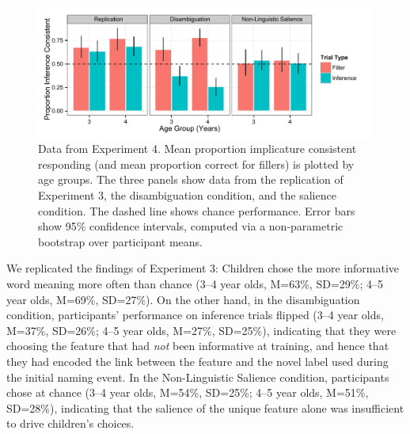 \documentclass[review]{elsarticle}
\begin{document}
\begin{figure}
\begin{center}
\includegraphics[width=5in]{e4_barplot.pdf}
\caption{\label{fig:kids} Data from Experiment 4. Mean proportion implicature consistent responding (and mean proportion correct for fillers) is plotted by age groups. The three panels show data from the replication of Experiment 3, the disambiguation condition, and the salience condition. The dashed line shows chance performance. Error bars show 95\% confidence intervals, computed via a non-parametric bootstrap over participant means.}
\end{center}
\end{figure}


We replicated the findings of Experiment 3: Children chose the more informative word meaning more often than chance (3--4 year olds, M=63\%, SD=29\%; 4--5 year olds, M=69\%, SD=27\%). On the other hand, in the disambiguation condition, participants' performance on inference trials flipped  (3--4 year olds, M=37\%, SD=26\%; 4--5 year olds, M=27\%, SD=25\%), indicating that they were choosing the feature that had \emph{not} been informative at training, and hence that they had encoded the link between the feature and the novel label used during the initial naming event. In the Non-Linguistic Salience condition, participants chose at chance  (3--4 year olds, M=54\%, SD=25\%; 4--5 year olds, M=51\%, SD=28\%), indicating that the salience of the unique feature alone was insufficient to drive children's choices. 
\end{document}
